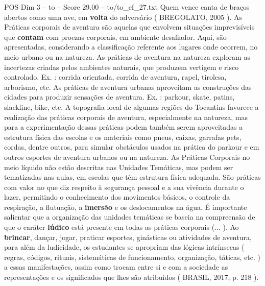 \begin{textsample}{POS Dim 3 – to – Score 29.00 – to/to\_ef\_27.txt}
Quem vence canta de braços abertos como uma ave, em \textbf{volta} do adversário ( BREGOLATO, 2005 ).
As Práticas corporais de aventura são aquelas que envolvem situações imprevisíveis que \textbf{contam} com proezas corporais, em ambiente desafiador.
Aqui, são apresentadas, considerando a classificação referente aos lugares onde ocorrem, no meio urbano ou na natureza.
As práticas de aventura na natureza exploram as incertezas criadas pelos ambientes naturais, que produzem vertigem e risco controlado.
Ex. : corrida orientada, corrida de aventura, rapel, tirolesa, arborismo, etc.
As práticas de aventura urbanas aproveitam as construções das cidades para produzir sensações de aventura.
Ex. : parkour, skate, patins, slackline, bike, etc.
A topografia local de algumas regiões do Tocantins favorece a realização das práticas corporais de aventura, especialmente na natureza, mas para a experimentação dessas práticas podem também serem aproveitadas a estrutura física das escolas e os materiais como pneus, caixas, garrafas pets, cordas, dentre outros, para simular obstáculos usados na prática do parkour e em outros esportes de aventura urbanos ou na natureza.
As Práticas Corporais no meio líquido não estão descritas nas Unidades Temáticas, mas podem ser tematizadas nas aulas, em escolas que têm estrutura física adequada.
São práticas com valor no que diz respeito à segurança pessoal e a sua vivência durante o lazer, permitindo o conhecimento dos movimentos básicos, o controle da respiração, a flutuação, a \textbf{imersão} e os deslocamentos na água.
É importante salientar que a organização das unidades temáticas se baseia na compreensão de que o caráter \textbf{lúdico} está presente em todas as práticas corporais (... ).
Ao \textbf{brincar}, dançar, jogar, praticar esportes, ginásticas ou atividades de aventura, para além da ludicidade, os estudantes se apropriam das lógicas intrínsecas ( regras, códigos, rituais, sistemáticas de funcionamento, organização, táticas, etc. ) a essas manifestações, assim como trocam entre si e com a sociedade as representações e os significados que lhes são atribuídos ( BRASIL, 2017, p. 218 ).

\end{textsample}
